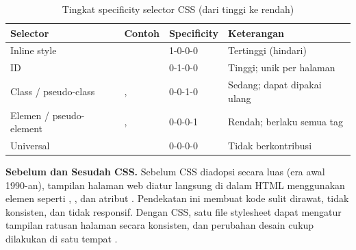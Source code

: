 \begin{table}[htbp]
\centering
\begin{tabular}{|P{3cm}|P{2.5cm}|P{3cm}|P{3.5cm}|}
\hline
\textbf{Selector} & \textbf{Contoh} & \textbf{Specificity} & \textbf{Keterangan} \\
\hline
Inline style &  & 1-0-0-0 & Tertinggi (hindari) \\
\hline
ID &  & 0-1-0-0 & Tinggi; unik per halaman \\
\hline
Class / pseudo-class & ,  & 0-0-1-0 & Sedang; dapat dipakai ulang \\
\hline
Elemen / pseudo-element & ,  & 0-0-0-1 & Rendah; berlaku semua tag \\
\hline
Universal & \code{*} & 0-0-0-0 & Tidak berkontribusi \\
\hline
\end{tabular}
\caption{Tingkat specificity selector CSS (dari tinggi ke rendah)}
\end{table}

\begin{konsep}
\textbf{Sebelum dan Sesudah CSS.} Sebelum CSS diadopsi secara luas (era awal 1990-an), tampilan halaman web diatur langsung di dalam HTML menggunakan elemen seperti , , dan atribut . Pendekatan ini membuat kode sulit dirawat, tidak konsisten, dan tidak responsif. Dengan CSS, satu file stylesheet dapat mengatur tampilan ratusan halaman secara konsisten, dan perubahan desain cukup dilakukan di satu tempat \cite{cssTricks}.
\end{konsep}

